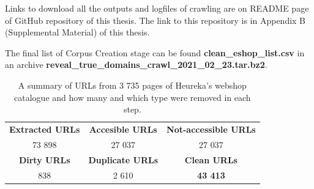 Links to download all the outputs and logfiles of crawling are on README page of GitHub repository of this thesis. The link to this repository is in Appendix B (Supplemental Material) of this thesis.

The final list of Corpus Creation stage can be found \textbf{clean\_eshop\_list.csv} in an archive \textbf{reveal\_true\_domains\_crawl\_2021\_02\_23.tar.bz2}.

\begin{table}[h!]
    \centering
    \begin{tabular}{ c | c | c } 
        \textbf{Extracted URLs} & \textbf{Accesible URLs} & \textbf{Not-accessible URLs} \\
      73 898 & 27 037 & 27 037 \\
     \textbf{Dirty URLs} & \textbf{Duplicate URLs} & \textbf{ Clean URLs} \\ \hline
      838 & 2 610 & \textbf{43 413}
    \end{tabular}
    \caption{A summary of URLs from 3 735 pages of Heureka's webshop catalogue and how many and which type were removed in each step.}
    \label{table:summary-corpus-creation}
\end{table}